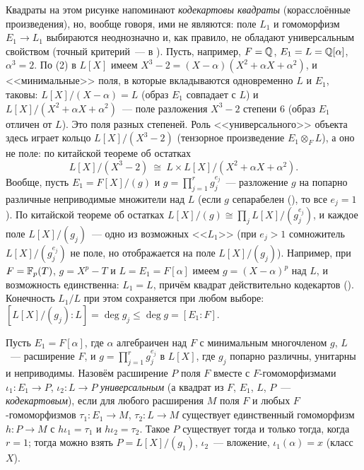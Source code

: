 \begin{aside}[2.15a]
Квадраты на этом рисунке напоминают \emph{кодекартовы квадраты} (корасслоённые произведения), но, вообще говоря, ими не
являются: поле $L_1$ и гомоморфизм $E_1\to L_1$ выбираются неоднозначно и, как правило, не обладают универсальным
свойством (точный критерий~--- в ). Пусть, например,
$F=\mathbb Q$, $E_1=L=\mathbb Q[\alpha]$, $\alpha^3=2$. По (2) в $L[X]$ имеем $X^3-2=(X-\alpha)(X^2+\alpha X+\alpha^2)$, и
<<минимальные>> поля, в которые вкладываются одновременно $L$ и $E_1$, таковы: $L[X]/(X-\alpha)=L$ (образ $E_1$
совпадает с $L$) и $L[X]/(X^2+\alpha X+\alpha^2)$~--- поле разложения $X^3-2$ степени $6$ (образ $E_1$ отличен от $L$). Это поля
разных степеней. Роль <<универсального>> объекта здесь играет кольцо $L[X]/(X^3-2)$ (тензорное произведение
$E_1\otimes_FL$), а оно не поле: по китайской теореме об остатках
\[
L[X]/(X^3-2)\ \cong\ L\times L[X]/(X^2+\alpha X+\alpha^2).
\]
Вообще, пусть $E_1=F[X]/(g)$ и $g=\prod_{j=1}^rg_j^{e_j}$~--- разложение $g$ на попарно различные неприводимые
множители над $L$ (если $g$ сепарабелен (), то все $e_j=1$). По китайской теореме об остатках
$L[X]/(g)\cong\prod_jL[X]/(g_j^{e_j})$, и каждое поле $L[X]/(g_j)$~--- одно из возможных <<$L_1$>> (при $e_j>1$
сомножитель $L[X]/(g_j^{e_j})$ не поле, но отображается на поле $L[X]/(g_j)$). Например, при $F=\mathbb F_p(T)$, $g=X^p-T$ и
$L=E_1=F[\alpha]$ имеем $g=(X-\alpha)^p$ над $L$, и возможность единственна: $L_1=L$, причём квадрат действительно
кодекартов (). Конечность $L_1/L$ при этом
сохраняется при любом выборе: $[L[X]/(g_j):L]=\deg g_j\le\deg g=[E_1:F]$.
\end{aside}

\begin{proposition}[2.15b]
Пусть $E_1=F[\alpha]$, где $\alpha$ алгебраичен над $F$ с минимальным многочленом $g$, $L$~--- расширение $F$, и
$g=\prod_{j=1}^rg_j^{e_j}$ в $L[X]$, где $g_j$ попарно различны, унитарны и неприводимы. Назовём расширение $P$ поля $F$
вместе с $F$-гомоморфизмами $\iota_1\colon E_1\to P$, $\iota_2\colon L\to P$ \emph{универсальным} (а квадрат из $F$, $E_1$, $L$,
$P$~--- \emph{кодекартовым}), если для любого расширения $M$ поля $F$ и любых $F$-гомоморфизмов $\tau_1\colon E_1\to M$,
$\tau_2\colon L\to M$ существует единственный гомоморфизм $h\colon P\to M$ с $h\iota_1=\tau_1$ и $h\iota_2=\tau_2$. Такое $P$
существует тогда и только тогда, когда $r=1$; тогда можно взять $P=L[X]/(g_1)$, $\iota_2$~--- вложение, $\iota_1(\alpha)=x$
(класс $X$).
\end{proposition}

